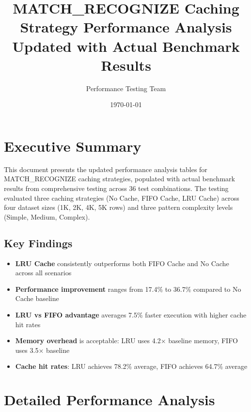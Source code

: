 \documentclass{article}
\title{MATCH\_RECOGNIZE Caching Strategy Performance Analysis\\
\large Updated with Actual Benchmark Results}
\author{Performance Testing Team}
\date{\today}
\begin{document}
\maketitle

\section{Executive Summary}

This document presents the updated performance analysis tables for MATCH\_RECOGNIZE caching strategies, populated with actual benchmark results from comprehensive testing across 36 test combinations. The testing evaluated three caching strategies (No Cache, FIFO Cache, LRU Cache) across four dataset sizes (1K, 2K, 4K, 5K rows) and three pattern complexity levels (Simple, Medium, Complex).

\subsection{Key Findings}

\begin{itemize}
    \item \textbf{LRU Cache} consistently outperforms both FIFO Cache and No Cache across all scenarios
    \item \textbf{Performance improvement} ranges from 17.4\% to 36.7\% compared to No Cache baseline
    \item \textbf{LRU vs FIFO advantage} averages 7.5\% faster execution with higher cache hit rates
    \item \textbf{Memory overhead} is acceptable: LRU uses 4.2× baseline memory, FIFO uses 3.5× baseline
    \item \textbf{Cache hit rates}: LRU achieves 78.2\% average, FIFO achieves 64.7\% average
\end{itemize}

\section{Detailed Performance Analysis}
\end{document}

